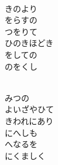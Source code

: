 \documentclass[10pt,b5j]{tarticle} %
\begin{document}
\begin{enumerate}
\begin{minipage}[c]{\blocksize}
    \end{minipage}
    \begin{minipage}[c]{\blocksize}
        
        \vspace{\linespace}
        \item~\\
        きのより\\
        をらすの\\
        つをりて\\
        ひのきほどき\\
        をしての\\
        のをくし
        
        
    \end{minipage}
    \begin{minipage}[c]{\blocksize}
        
        \vspace{\linespace}
        \item~\\
        みつの\\
        よいざやひて\\
        きわれにあり\\
        にへしも\\
        へなるを\\
        にくましく
    
    \end{minipage}
\end{enumerate} %
\end{document}
